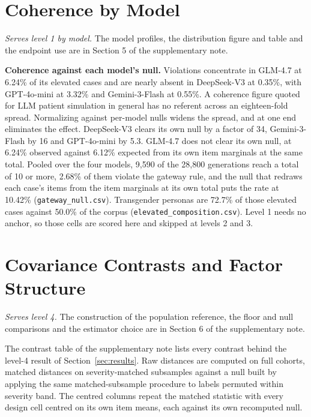 \documentclass[wcp]{jmlr}
\begin{document}
\section{Coherence by Model}
\label{app:profiles}
\label{app:shape}
\noindent\emph{Serves level 1 by model.} The model profiles, the distribution figure and table and the endpoint use are in Section 5 of the supplementary note.

\textbf{Coherence against each model's null.} Violations concentrate in GLM-4.7 at 6.24\% of its elevated cases and are nearly absent in DeepSeek-V3 at 0.35\%, with GPT-4o-mini at 3.32\% and Gemini-3-Flash at 0.55\%. A coherence figure quoted for LLM patient simulation in general has no referent across an eighteen-fold spread. Normalizing against per-model nulls widens the spread, and at one end eliminates the effect. DeepSeek-V3 clears its own null by a factor of 34, Gemini-3-Flash by 16 and GPT-4o-mini by 5.3. GLM-4.7 does not clear its own null, at 6.24\% observed against 6.12\% expected from its own item marginals at the same total. Pooled over the four models, 9,590 of the 28,800 generations reach a total of 10 or more, 2.68\% of them violate the gateway rule, and the null that redraws each case's items from the item marginals at its own total puts the rate at 10.42\% (\texttt{gateway\_null.csv}). Transgender personas are 72.7\% of those elevated cases against 50.0\% of the corpus (\texttt{elevated\_composition.csv}). Level 1 needs no anchor, so those cells are scored here and skipped at levels 2 and 3.

\section{Covariance Contrasts and Factor Structure}
\label{app:contrasts}
\label{app:factor}
\noindent\emph{Serves level 4.} The construction of the population reference, the floor and null comparisons and the estimator choice are in Section 6 of the supplementary note.

The contrast table of the supplementary note lists every contrast behind the level-4 result of Section~\ref{sec:results}. Raw distances are computed on full cohorts, matched distances on severity-matched subsamples against a null built by applying the same matched-subsample procedure to labels permuted within severity band. The centred columns repeat the matched statistic with every design cell centred on its own item means, each against its own recomputed null.
\end{document}
